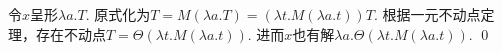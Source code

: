 \begin{pf} \rm 
   令$x$呈形$\lambda a.T$. 原式化为$T=M(\lambda a.T)=(\lambda t. M (\lambda a.t)) T$. 根据一元不动点定理，存在不动点$T=\Theta (\lambda t.M(\lambda a.t))$. 进而$x$也有解$\lambda a.\Theta (\lambda t.M(\lambda a.t))$.
    \qed
\end{pf}